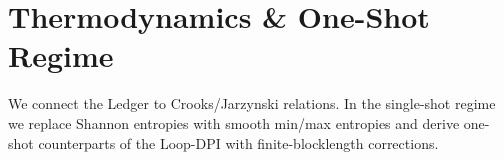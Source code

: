 
\section{Thermodynamics \& One-Shot Regime}
We connect the Ledger to Crooks/Jarzynski relations. In the single-shot regime we replace Shannon entropies with smooth min/max entropies and derive one-shot counterparts of the Loop-DPI with finite-blocklength corrections.
